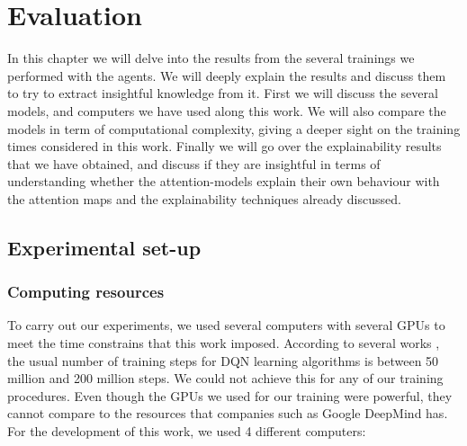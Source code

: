 \chapter{Evaluation}
\label{cha:evaluation}

In this chapter we will delve into the results from the several trainings we performed with the agents. We will deeply explain the results and discuss them to try to extract insightful knowledge from it. First we will discuss the several models, and computers we have used along this work. We will also compare the models in term of computational complexity, giving a deeper sight on the training times considered in this work. Finally we will go over the explainability results that we have obtained, and discuss if they are insightful in terms of understanding whether the attention-models explain their own behaviour with the attention maps and the explainability techniques already discussed.

\section{Experimental set-up}
\label{sec:exp_setup}

\subsection{Computing resources}
To carry out our experiments, we used several computers with several GPUs to meet the time constrains that this work imposed. According to several works \cite{mnih2013playing, hessel2017rainbow, schaul2016prioritized, meng2024deep}, the usual number of training steps for DQN learning algorithms is between 50 million and 200 million steps. We could not achieve this for any of our training procedures. Even though the GPUs we used for our training were powerful, they cannot compare to the resources that companies such as Google DeepMind has. For the development of this work, we used 4 different computers:

